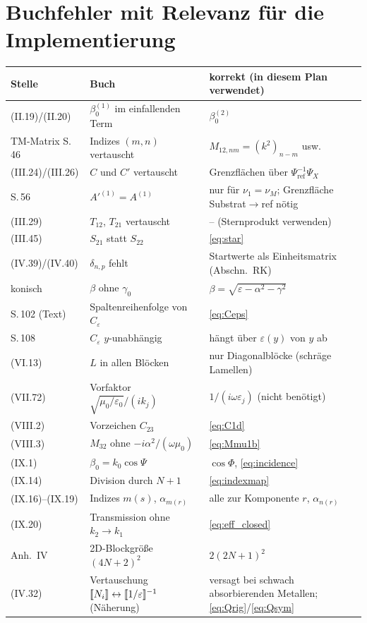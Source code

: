 \section{Buchfehler mit Relevanz für die Implementierung}\label{sec:errata}
\begin{center}
\small
\begin{tabular}{p{2.3cm}p{5.4cm}p{6.6cm}}
\toprule
Stelle & Buch & korrekt (in diesem Plan verwendet) \\
\midrule
(II.19)/(II.20) & $\beta_0^{(1)}$ im einfallenden Term & $\beta_0^{(2)}$ \\
TM-Matrix S.\,46 & Indizes $(m,n)$ vertauscht & $M_{12,nm}=(k^2)_{n-m}$ usw. \\
(III.24)/(III.26) & $C$ und $C'$ vertauscht & Grenzflächen über $\Psi_{\text{ref}}^{-1}\Psi_X$ \\
S.\,56 & $A'^{(1)}=A^{(1)}$ & nur für $\nu_1=\nu_M$; Grenzfläche Substrat$\to$ref nötig \\
(III.29) & $T_{12}$, $T_{21}$ vertauscht & -- (Sternprodukt verwenden) \\
(III.45) & $S_{21}$ statt $S_{22}$ & \eqref{eq:star} \\
(IV.39)/(IV.40) & $\delta_{n,p}$ fehlt & Startwerte als Einheitsmatrix (Abschn.\ RK) \\
konisch & $\beta$ ohne $\gamma_0$ & $\beta=\sqrt{\varepsilon-\alpha^2-\gamma^2}$ \\
S.\,102 (Text) & Spaltenreihenfolge von $C_\varepsilon$ & \eqref{eq:Ceps} \\
S.\,108 & $C_\varepsilon$ $y$-unabhängig & hängt über $\varepsilon(y)$ von $y$ ab \\
(VI.13) & $L$ in allen Blöcken & nur Diagonalblöcke (schräge Lamellen) \\
(VII.72) & Vorfaktor $\sqrt{\mu_0/\varepsilon_0}/(ik_j)$ & $1/(i\omega\varepsilon_j)$ (nicht benötigt) \\
(VIII.2) & Vorzeichen $C_{23}$ & \eqref{eq:C1d} \\
(VIII.3) & $M_{32}$ ohne $-i\alpha^2/(\omega\mu_0)$ & \eqref{eq:Mmu1b} \\
(IX.1) & $\beta_0=k_0\cos\Psi$ & $\cos\Phi$, \eqref{eq:incidence} \\
(IX.14) & Division durch $N+1$ & \eqref{eq:indexmap} \\
(IX.16)--(IX.19) & Indizes $m(s)$, $\alpha_{m(r)}$ & alle zur Komponente $r$, $\alpha_{n(r)}$ \\
(IX.20) & Transmission ohne $k_2\to k_1$ & \eqref{eq:eff_closed} \\
Anh.\ IV & 2D-Blockgröße $(4N+2)^2$ & $2(2N+1)^2$ \\
(IV.32) & Vertauschung $[\![N_i]\!]\leftrightarrow[\![1/\varepsilon]\!]^{-1}$ (Näherung) & versagt bei schwach absorbierenden Metallen;
  \eqref{eq:Qrig}/\eqref{eq:Qsym} \\
\bottomrule
\end{tabular}
\end{center}

